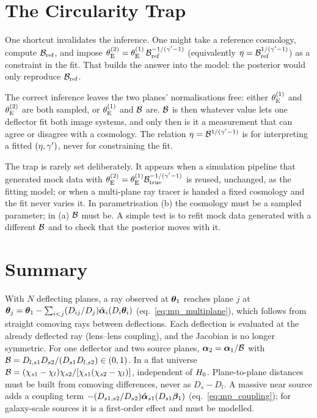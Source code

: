 \section{The Circularity Trap}
\label{sec:mpi_circular}

One shortcut invalidates the inference.  One might take a reference cosmology,
compute $\mathcal{B}_{\rm ref}$, and impose
$\theta_{\mathrm{E}}^{(2)}=\theta_{\mathrm{E}}^{(1)}\,\mathcal{B}_{\rm ref}^{-1/(\gamma'-1)}$ (equivalently
$\eta=\mathcal{B}_{\rm ref}^{1/(\gamma'-1)}$) as a constraint in the fit.  That
builds the answer into the model: the posterior would only reproduce
$\mathcal{B}_{\rm ref}$.

\begin{keybox}
The correct inference leaves the two planes' normalisations free:
either $\theta_{\mathrm{E}}^{(1)}$ and $\theta_{\mathrm{E}}^{(2)}$ are both sampled, or
$\theta_{\mathrm{E}}^{(1)}$ and $\mathcal{B}$ are.  $\mathcal{B}$ is then whatever value lets one
deflector fit both image systems, and only then is it a
measurement that can agree or disagree with a cosmology.  The
relation $\eta=\mathcal{B}^{1/(\gamma'-1)}$ is for interpreting a fitted
$(\eta,\gamma')$, never for constraining the fit.
\end{keybox}

\begin{annotation}
The trap is rarely set deliberately.  It appears when a simulation
pipeline that generated mock data with
$\theta_{\mathrm{E}}^{(2)}=\theta_{\mathrm{E}}^{(1)}\mathcal{B}_{\rm true}^{-1/(\gamma'-1)}$ is reused,
unchanged, as the fitting model; or when a multi-plane ray tracer is
handed a fixed cosmology and the fit never varies it.  In
parametrisation (b) the cosmology must be a sampled parameter; in
(a) $\mathcal{B}$ must be.  A simple test is to refit mock data generated with
a different $\mathcal{B}$ and to check that the posterior moves with it.
\end{annotation}


\section{Summary}
\label{sec:mp_summary}

With $N$ deflecting planes, a ray observed at $\boldsymbol{\theta}_1$
reaches plane $j$ at
$\boldsymbol{\theta}_j=\boldsymbol{\theta}_1-\sum_{i<j}(D_{ij}/D_j)\hat{\boldsymbol{\alpha}}_i(D_i\boldsymbol{\theta}_i)$
(eq.~\eqref{eq:mp_multiplane}), which follows from straight
comoving rays between deflections.  Each deflection is evaluated
at the already deflected ray (lens--lens coupling), and the
Jacobian is no longer symmetric.
For one deflector and two source planes, $\boldsymbol{\alpha}_2=\boldsymbol{\alpha}_1/\mathcal{B}$
with $\mathcal{B}=D_{l,s1}D_{s2}/(D_{s1}D_{l,s2})\in(0,1)$.  In a flat
universe
$\mathcal{B}=(\chi_{s1}-\chi_l)\chi_{s2}/[\chi_{s1}(\chi_{s2}-\chi_l)]$,
independent of $H_0$.  Plane-to-plane distances must be
built from comoving differences, never as $D_s-D_l$.
A massive near source adds a coupling term
$-(D_{s1,s2}/D_{s2})\hat{\boldsymbol{\alpha}}_{s1}(D_{s1}\boldsymbol{\beta}_1)$
(eq.~\eqref{eq:mp_coupling}); for galaxy-scale sources it is a
first-order effect and must be modelled.

